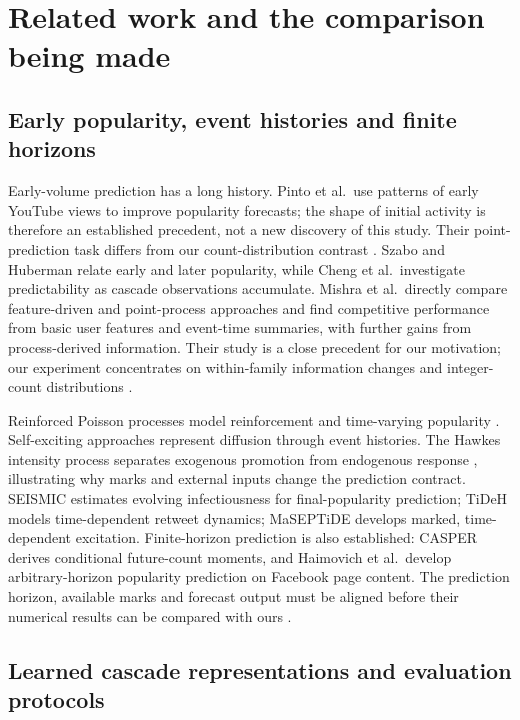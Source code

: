 \hypertarget{related-work-and-the-comparison-being-made}{%
\section{Related work and the comparison being made}}

\hypertarget{early-popularity-event-histories-and-finite-horizons}{%
\subsection{Early popularity, event histories and finite horizons}}

Early-volume prediction has a long history. Pinto et al.~use patterns of early YouTube views to improve popularity forecasts; the shape of initial activity is therefore an established precedent, not a new discovery of this study. Their point-prediction task differs from our count-distribution contrast \cite{pinto2013}. Szabo and Huberman relate early and later popularity, while Cheng et al.~investigate predictability as cascade observations accumulate. Mishra et al.~directly compare feature-driven and point-process approaches and find competitive performance from basic user features and event-time summaries, with further gains from process-derived information. Their study is a close precedent for our motivation; our experiment concentrates on within-family information changes and integer-count distributions \cite{szabo2010,cheng2014,mishra2016}.

Reinforced Poisson processes model reinforcement and time-varying popularity \cite{rpp2014}. Self-exciting approaches represent diffusion through event histories. The Hawkes intensity process separates exogenous promotion from endogenous response \cite{hip2017}, illustrating why marks and external inputs change the prediction contract. SEISMIC estimates evolving infectiousness for final-popularity prediction; TiDeH models time-dependent retweet dynamics; MaSEPTiDE develops marked, time-dependent excitation. Finite-horizon prediction is also established: CASPER derives conditional future-count moments, and Haimovich et al.~develop arbitrary-horizon popularity prediction on Facebook page content. The prediction horizon, available marks and forecast output must be aligned before their numerical results can be compared with ours \cite{seismic2015,tideh2016,maseptide2018,casper2022,haimovich2022}.

\hypertarget{learned-cascade-representations-and-evaluation-protocols}{%
\subsection{Learned cascade representations and evaluation protocols}}


